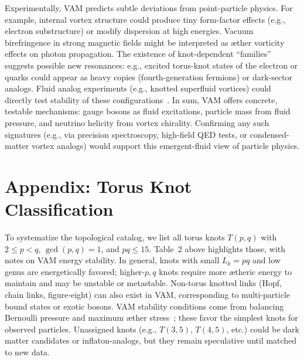 \documentclass[a4paper,12pt]{article}
\begin{document}
Experimentally, VAM predicts subtle deviations from point-particle physics. For example, internal vortex structure could produce tiny form-factor effects (e.g., electron substructure) or modify dispersion at high energies. Vacuum birefringence in strong magnetic fields might be interpreted as æther vorticity effects on photon propagation. The existence of knot-dependent “families” suggests possible new resonances: e.g., excited torus-knot states of the electron or quarks could appear as heavy copies (fourth-generation fermions) or dark-sector analogs. Fluid analog experiments (e.g., knotted superfluid vortices) could directly test stability of these configurations~\cite{4-StandardModel-Lagrangian-VAM, Optical-Knots-Contact-Geometry-II}. In sum, VAM offers concrete, testable mechanisms: gauge bosons as fluid excitations, particle mass from fluid pressure, and neutrino helicity from vortex chirality. Confirming any such signatures (e.g., via precision spectroscopy, high-field QED tests, or condensed-matter vortex analogs) would support this emergent-fluid view of particle physics.

\section*{Appendix: Torus Knot Classification}
To systematize the topological catalog, we list all torus knots $T(p,q)$ with $2\leq p<q$, $\gcd(p,q)=1$, and $pq\leq 15$. Table~2 above highlights those, with notes on VAM energy stability. In general, knots with small $L_k=pq$ and low genus are energetically favored; higher-$p,q$ knots require more ætheric energy to maintain and may be unstable or metastable. Non-torus knotted links (Hopf, chain links, figure-eight) can also exist in VAM, corresponding to multi-particle bound states or exotic bosons. VAM stability conditions come from balancing Bernoulli pressure and maximum æther stress~\cite{4-StandardModel-Lagrangian-VAM, Appendix_CalculateNeucleusMass}; these favor the simplest knots for observed particles. Unassigned knots (e.g., $T(3,5)$, $T(4,5)$, etc.) could be dark matter candidates or inflaton-analogs, but they remain speculative until matched to new data.
\end{document}
